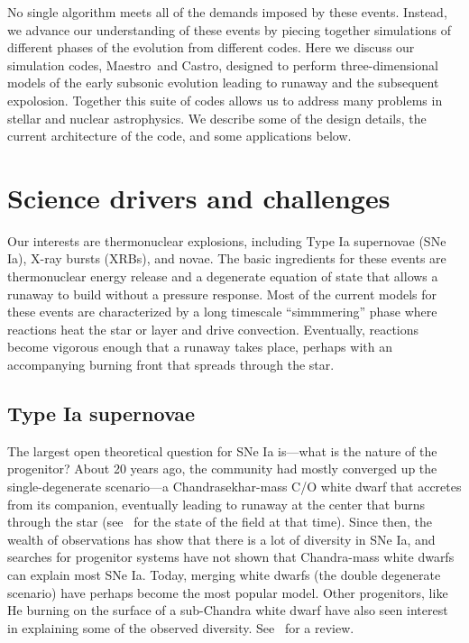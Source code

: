\documentclass[a4paper]{jpconf}
\newcommand{\maestro}{{\sffamily Maestro}}
\newcommand{\castro}{{\sffamily Castro}}
\begin{document}
No single algorithm meets all of the demands imposed by these events.
Instead, we advance our understanding of these events by piecing
together simulations of different phases of the evolution from
different codes.  Here we discuss our simulation codes, \maestro\ and
\castro, designed to perform three-dimensional models of the early
subsonic evolution leading to runaway and the subsequent expolosion.
Together this suite of codes allows us to address many problems in
stellar and nuclear astrophysics.  We describe some of the design
details, the current architecture of the code, and some applications
below.

\section{Science drivers and challenges}

Our interests are thermonuclear explosions, including Type Ia
supernovae (SNe Ia), X-ray bursts (XRBs), and novae.  The basic
ingredients for these events are thermonuclear energy release and a
degenerate equation of state that allows a runaway to build without a
pressure response.  Most of the current models for these events are
characterized by a long timescale ``simmmering'' phase where reactions
heat the star or layer and drive convection.  Eventually, reactions
become vigorous enough that a runaway takes place, perhaps with an
accompanying burning front that spreads through the star.

\subsection{Type Ia supernovae}

The largest open theoretical question for SNe Ia is---what is the
nature of the progenitor?  About 20 years ago, the community had
mostly converged up the single-degenerate scenario---a
Chandrasekhar-mass C/O white dwarf that accretes from its companion,
eventually leading to runaway at the center that burns through the
star (see~\cite{hillebrandtniemeyer2000} for the state of the field at
that time).  Since then, the wealth of observations has show that
there is a lot of diversity in SNe Ia, and searches for progenitor
systems have not shown that Chandra-mass white dwarfs can explain most
SNe Ia.  Today, merging white dwarfs (the double degenerate scenario)
have perhaps become the most popular model.  Other progenitors, like
He burning on the surface of a sub-Chandra white dwarf have also seen
interest in explaining some of the observed diversity.
See~\cite{araa-maoz} for a review.
\end{document}
